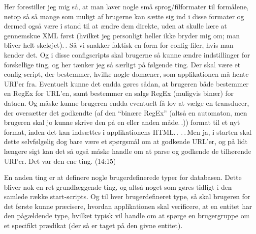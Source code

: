 \documentclass{report}
\begin{document}
Her forestiller jeg mig så, at man laver nogle små sprog/filformater til formålene, netop så så mange som muligt af brugerne kan sætte sig ind i disse formater og dermed også være i stand til at ændre dem direkte, uden at skulle lære at gennemskue XML først (hvilket jeg personligt heller ikke bryder mig om; man bliver helt skeløjet).\,. Så vi snakker faktisk en form for config-filer, hvis man kender det. Og i disse configscripts skal brugerne så kunne ændre indstillinger for forskellige ting, og her tænker jeg så særligt på følgende ting. Der skal være et config-script, der bestemmer, hvilke nogle domæner, som applikationen må hente URI'er fra. Eventuelt kunne det endda gøres sådan, at brugeren både bestemmer en RegEx for URL'en, samt bestemmer en salgs RegEx (muligvis binær) for dataen. Og måske kunne brugeren endda eventuelt få lov at vælge en transducer, der oversætter det godkendte (af den ``binære RegEx'' (altså en automaton, men brugeren skal jo kunne skrive den på en eller anden måde.\,.)) format til et nyt format, inden det kan indsættes i applikationens HTML.\,. .\,.\,Men ja, i starten skal dette selvfølgelig dog bare være et spørgsmål om at godkende URL'er, og på lidt længere sigt kan det så også måske handle om at parse og godkende de tilhørende URI'er. Det var den ene ting. (14:15)

En anden ting er at definere nogle brugerdefinerede typer for databasen. Dette bliver nok en ret grundlæggende ting, og altså noget som gøres tidligt i den samlede række start-scripts. Og til hver brugerdefineret type, så skal brugeren for det første kunne præcisere, hvordan applikationen skal verificere, at en entitet har den pågældende type, hvilket typisk vil handle om at spørge en brugergruppe om et specifikt prædikat (der så er taget på den givne entitet). 
\end{document}
